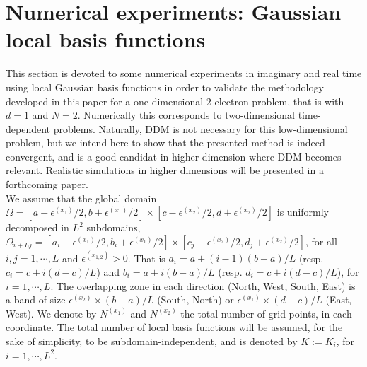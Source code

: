 \section{Numerical experiments: Gaussian local basis functions}\label{NumGauss}
This section is devoted to some numerical experiments in imaginary and real time using local Gaussian basis functions in order to validate the methodology developed in this paper for a one-dimensional 2-electron problem, that is with $d=1$ and $N=2$. Numerically this corresponds to two-dimensional time-dependent problems. Naturally, DDM is not necessary for this low-dimensional problem, but we intend here to show that the presented method is indeed convergent, and is a good candidat in higher dimension where DDM becomes relevant. Realistic simulations in higher dimensions will be presented in a forthcoming paper.\\
We assume that the global domain $\Omega=[a-\epsilon^{(x_1)}/2,b+\epsilon^{(x_1)}/2]\times[c-\epsilon^{(x_2)}/2,d+\epsilon^{(x_2)}/2]$ is uniformly decomposed in $L^2$ subdomains, $\Omega_{i+Lj}=[a_i-\epsilon^{(x_1)}/2,b_i+\epsilon^{(x_1)}/2]\times[c_j-\epsilon^{(x_2)}/2,d_j+\epsilon^{(x_2)}/2]$, for all $i,j=1,\cdots,L$ and $\epsilon^{(x_{1,2})}>0$. That is $a_i=a+(i-1)(b-a)/L$ (resp. $c_i=c+i(d-c)/L$) and $b_i=a+i(b-a)/L$ (resp. $d_i=c+i(d-c)/L$), for $i=1,\cdots,L$. The overlapping zone in each direction (North, West, South, East) is a band of size $\epsilon^{(x_2)}\times (b-a)/L$ (South, North) or $\epsilon^{(x_1)}\times (d-c)/L$ (East, West).  We denote by $N^{(x_1)}$ and $N^{(x_2)}$ the total number of grid points, in each coordinate. The total number of local basis functions will be assumed, for the sake of simplicity, to be subdomain-independent, and is denoted by $K:=K_i$, for $i=1,\cdots,L^2$.
